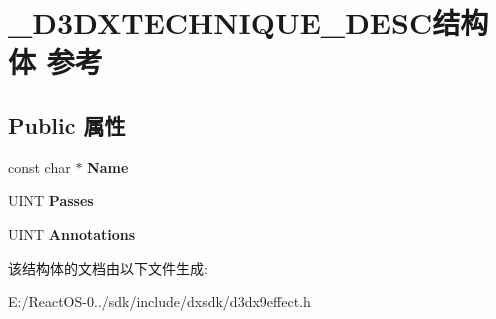 \hypertarget{struct___d3_d_x_t_e_c_h_n_i_q_u_e___d_e_s_c}{}\section{\+\_\+\+D3\+D\+X\+T\+E\+C\+H\+N\+I\+Q\+U\+E\+\_\+\+D\+E\+S\+C结构体 参考}
\label{struct___d3_d_x_t_e_c_h_n_i_q_u_e___d_e_s_c}
\subsection*{Public 属性}
\begin{DoxyCompactItemize}
\item 
\mbox{\label{struct___d3_d_x_t_e_c_h_n_i_q_u_e___d_e_s_c_a4bead62e263e6f36f4b53c7bb8267af4}} 
const char $\ast$ {\bfseries Name}
\item 
\mbox{\label{struct___d3_d_x_t_e_c_h_n_i_q_u_e___d_e_s_c_aea8e1fa70773104cc7fae3090e55820f}} 
U\+I\+NT {\bfseries Passes}
\item 
\mbox{\label{struct___d3_d_x_t_e_c_h_n_i_q_u_e___d_e_s_c_ae0ac3fb9703c434139475edc38f13c74}} 
U\+I\+NT {\bfseries Annotations}
\end{DoxyCompactItemize}


该结构体的文档由以下文件生成\+:\begin{DoxyCompactItemize}
\item 
E\+:/\+React\+O\+S-\/0../sdk/include/dxsdk/d3dx9effect.\+h\end{DoxyCompactItemize}
